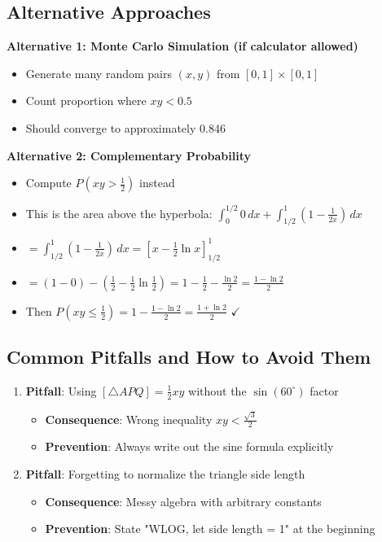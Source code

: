 \documentclass[11pt]{article}
\begin{document}
\begin{solutionbox}
\subsection*{Alternative Approaches}

\textbf{Alternative 1: Monte Carlo Simulation (if calculator allowed)}
\begin{itemize}
    \item Generate many random pairs $(x, y)$ from $[0,1] \times [0,1]$
    \item Count proportion where $xy < 0.5$
    \item Should converge to approximately 0.846
\end{itemize}

\textbf{Alternative 2: Complementary Probability}
\begin{itemize}
    \item Compute $P(xy > \frac{1}{2})$ instead
    \item This is the area above the hyperbola: $\int_0^{1/2} 0 \, dx + \int_{1/2}^1 (1 - \frac{1}{2x}) \, dx$
    \item $= \int_{1/2}^1 (1 - \frac{1}{2x}) \, dx = [x - \frac{1}{2}\ln x]_{1/2}^1$
    \item $= (1 - 0) - (\frac{1}{2} - \frac{1}{2}\ln\frac{1}{2}) = 1 - \frac{1}{2} - \frac{\ln 2}{2} = \frac{1 - \ln 2}{2}$
    \item Then $P(xy \leq \frac{1}{2}) = 1 - \frac{1 - \ln 2}{2} = \frac{1 + \ln 2}{2}$ $\checkmark$
\end{itemize}

\subsection*{Common Pitfalls and How to Avoid Them}

\begin{enumerate}
    \item \textbf{Pitfall}: Using $[\triangle APQ] = \frac{1}{2}xy$ without the $\sin(60^\circ)$ factor
    \begin{itemize}
        \item \textbf{Consequence}: Wrong inequality $xy < \frac{\sqrt{3}}{2}$
        \item \textbf{Prevention}: Always write out the sine formula explicitly
    \end{itemize}
    
    \item \textbf{Pitfall}: Forgetting to normalize the triangle side length
    \begin{itemize}
        \item \textbf{Consequence}: Messy algebra with arbitrary constants
        \item \textbf{Prevention}: State "WLOG, let side length = 1" at the beginning
    \end{itemize}
    

\end{enumerate}
\end{solutionbox}
\end{document}
